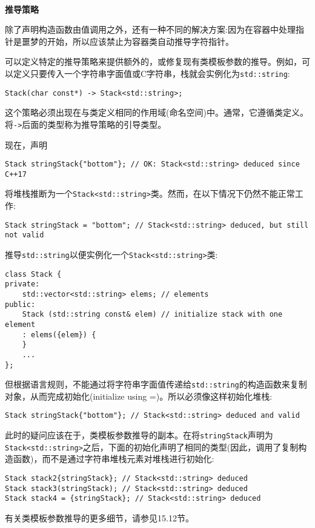 \hspace*{\fill} \\ %
\noindent
\textbf{推导策略}

除了声明构造函数由值调用之外，还有一种不同的解决方案:因为在容器中处理指针是噩梦的开始，所以应该禁止为容器类自动推导字符指针。

可以定义特定的推导策略来提供额外的，或修复现有类模板参数的推导。例如，可以定义只要传入一个字符串字面值或C字符串，栈就会实例化为\texttt{std::string}:

\begin{lstlisting}[style=styleCXX]
Stack(char const*) -> Stack<std::string>;
\end{lstlisting}

这个策略必须出现在与类定义相同的作用域(命名空间)中。通常，它遵循类定义。将\texttt{->}后面的类型称为推导策略的引导类型。

现在，声明

\begin{lstlisting}[style=styleCXX]
Stack stringStack{"bottom"}; // OK: Stack<std::string> deduced since C++17
\end{lstlisting}

将堆栈推断为一个\texttt{Stack<std::string>}类。然而，在以下情况下仍然不能正常工作:

\begin{lstlisting}[style=styleCXX]
Stack stringStack = "bottom"; // Stack<std::string> deduced, but still not valid
\end{lstlisting}

推导\texttt{std::string}以便实例化一个\texttt{Stack<std::string>}类:

\begin{lstlisting}[style=styleCXX]
class Stack {
private:
	std::vector<std::string> elems; // elements
public:
	Stack (std::string const& elem) // initialize stack with one element
	: elems({elem}) {
	}
	...
};
\end{lstlisting}

但根据语言规则，不能通过将字符串字面值传递给\texttt{std::string}的构造函数来复制对象，从而完成初始化(initialize using =)。所以必须像这样初始化堆栈:

\begin{lstlisting}[style=styleCXX]
Stack stringStack{"bottom"}; // Stack<std::string> deduced and valid
\end{lstlisting}

此时的疑问应该在于，类模板参数推导的副本。在将\texttt{stringStack}声明为\texttt{Stack<std::string>}之后，下面的初始化声明了相同的类型(因此，调用了复制构造函数)，而不是通过字符串堆栈元素对堆栈进行初始化:

\begin{lstlisting}[style=styleCXX]
Stack stack2{stringStack}; // Stack<std::string> deduced
Stack stack3(stringStack); // Stack<std::string> deduced
Stack stack4 = {stringStack}; // Stack<std::string> deduced
\end{lstlisting}

有关类模板参数推导的更多细节，请参见15.12节。





















